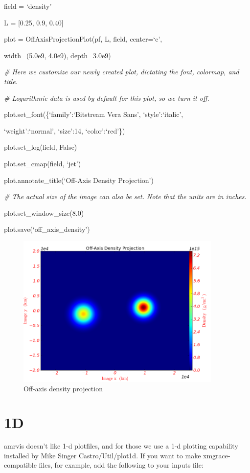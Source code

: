 field = `density'

L = [0.25, 0.9, 0.40]

plot = OffAxisProjectionPlot(pf, L, field, center=`c',

{\setlength{\parindent}{146pt}width=(5.0e9, 4.0e9), depth=3.0e9)}

{\it\# Here we customize our newly created plot, dictating the font, colormap, and title.}
{\setlength{\parskip}{0pt}

{\it\# Logarithmic data is used by default for this plot, so we turn it off.}

plot.set\_font(\{`family':`Bitstream Vera Sans', `style':`italic',
}

{\setlength{\parindent}{63.5pt}`weight':`normal', `size':14, `color':`red'\})}

plot.set\_log(field, False)

plot.set\_cmap(field, `jet')

plot.annotate\_title(`Off-Axis Density Projection')

{\it\# The actual size of the image can also be set. Note that the units are in inches.}
{\setlength{\parskip}{0pt}

plot.set\_window\_size(8.0)
}

plot.save(`off\_axis\_density')
\begin{figure}[h]
  \centering
  \includegraphics[width=4in]{OffAxisProjection_density}
  \caption{Off-axis density projection}
\end{figure}


\section{1D}

amrvis doesn't like 1-d plotfiles, and for those we use a 1-d plotting
capability installed by Mike Singer Castro/Util/plot1d.  If you want
to make xmgrace-compatible files, for example, add the following to
your inputs file:\\

